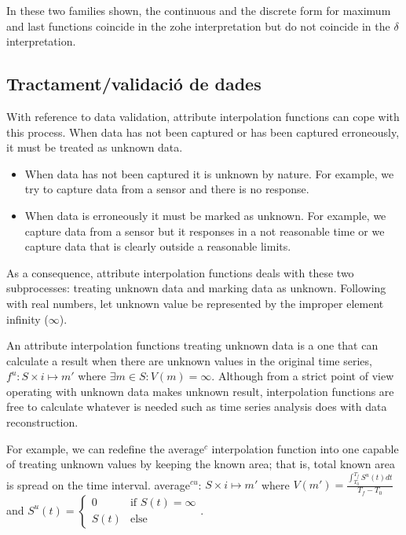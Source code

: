 In these two families shown, the continuous and the discrete form for
maximum and last functions coincide in the zohe interpretation but do
not coincide in the $\delta$ interpretation. 







\subsection{Tractament/validació de dades}\todo{}

With reference to data validation, attribute interpolation functions
can cope with this process. When data has not been captured or has
been captured erroneously, it must be treated as unknown data.
\begin{itemize}
\item When data has not been captured it is unknown by nature. For
  example, we try to capture data from a sensor and there is no
  response.
\item When data is erroneously it must be marked as unknown. For
  example, we capture data from a sensor but it responses in a not
  reasonable time or we capture data that is clearly outside a
  reasonable limits.
\end{itemize}
As a consequence, attribute interpolation functions deals with these
two subprocesses: treating unknown data and marking data as
unknown. Following with real numbers, let unknown value be represented
by the improper element infinity ($\infty$).  

An attribute interpolation functions treating unknown data is a one
that can calculate a result when there are unknown values in the
original time series, $f^u: S \times i \mapsto m'$ where $\exists m \in
S: V(m)=\infty$. Although from a strict point of view
operating with unknown data makes unknown result, interpolation
functions are free to calculate whatever is needed such as time series
analysis does with data reconstruction.

For example, we can redefine the average$^{c}$ interpolation function
into one capable of treating unknown values by keeping the known area;
that is, total known area is spread on the time interval.
average$^{cu}$: $S \times i \mapsto m'$ where $V(m') =
\frac{\int_{T_0}^{T_f} S^u(t)dt}{T_f-T_0}$ and $S^u(t)=
\begin{cases}
  0 &\text{if }  S(t)=\infty\\
  S(t) & \text{else }
\end{cases}$.


